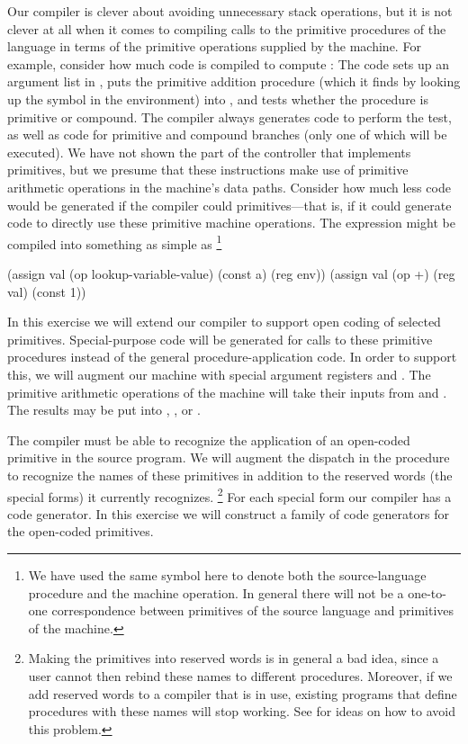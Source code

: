 \begin{exercise}
	\label{Exercise 5.38}
	Our compiler is clever about avoiding unnecessary stack operations, but it is not clever at all when it comes to compiling calls to the primitive procedures of the language in terms of the primitive operations supplied by the machine.
	For example, consider how much code is compiled to compute :
	The code sets up an argument list in , puts the primitive addition procedure (which it finds by looking up the symbol \code{+} in the environment) into , and tests whether the procedure is primitive or compound.
	The compiler always generates code to perform the test, as well as code for primitive and compound branches (only one of which will be executed).
	We have not shown the part of the controller that implements primitives, but we presume that these instructions make use of primitive arithmetic operations in the machine’s data paths.
	Consider how much less code would be generated if the compiler could  primitives---that is, if it could generate code to directly use these primitive machine operations.
	The expression  might be compiled into something as simple as%
	\footnote{
		We have used the same symbol \code{+} here to denote both the source-language procedure and the machine operation.
		In general there will not be a one-to-one correspondence between primitives of the source language and primitives of the machine.
	}
	\begin{scheme}
	  (assign
	   val (op lookup-variable-value) (const a) (reg env))
	  (assign val (op +) (reg val) (const 1))
	\end{scheme}
	In this exercise we will extend our compiler to support open coding of selected primitives.
	Special-purpose code will be generated for calls to these primitive procedures instead of the general procedure-application code.
	In order to support this, we will augment our machine with special argument registers  and .
	The primitive arithmetic operations of the machine will take their inputs from  and .
	The results may be put into , , or .

	The compiler must be able to recognize the application of an open-coded primitive in the source program.
	We will augment the dispatch in the  procedure to recognize the names of these primitives in addition to the reserved words (the special forms) it currently recognizes.%
	\footnote{
		Making the primitives into reserved words is in general a bad idea, since a user cannot then rebind these names to different procedures.
		Moreover, if we add reserved words to a compiler that is in use, existing programs that define procedures with these names will stop working.
		See  for ideas on how to avoid this problem.
	}
	For each special form our compiler has a code generator.
	In this exercise we will construct a family of code generators for the open-coded primitives.
	\begin{enumerate}[label = \alph*., leftmargin = *]


\end{enumerate}
\end{exercise}

